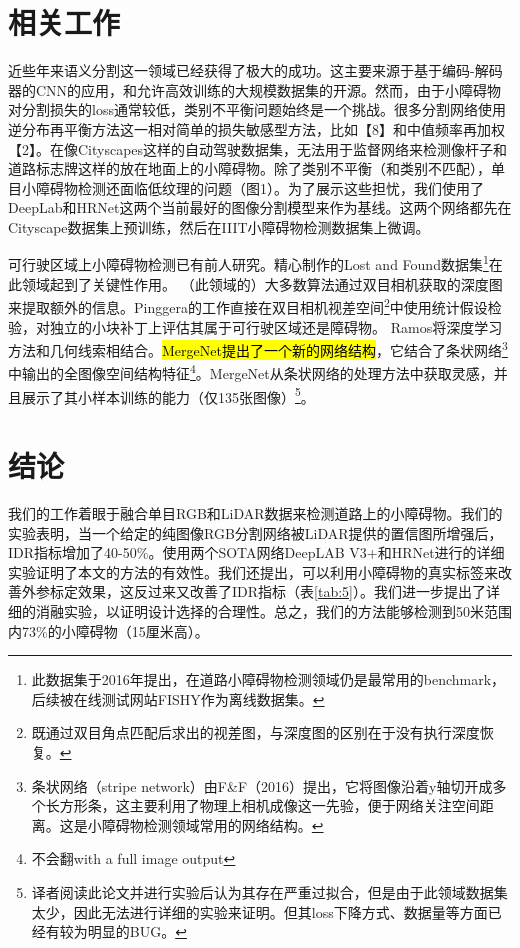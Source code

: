\documentclass[lang=cn,11pt]{elegantpaper}
\begin{document}
\section{相关工作}
近些年来语义分割这一领域已经获得了极大的成功。这主要来源于基于编码-解码器的CNN的应用，和允许高效训练的大规模数据集的开源。然而，由于小障碍物对分割损失的loss通常较低，类别不平衡问题始终是一个挑战。很多分割网络使用逆分布再平衡方法这一相对简单的损失敏感型方法，比如【8】和中值频率再加权【2】。在像Cityscapes这样的自动驾驶数据集，无法用于监督网络来检测像杆子和道路标志牌这样的放在地面上的小障碍物。除了类别不平衡（和类别不匹配），单目小障碍物检测还面临低纹理的问题（图1）。为了展示这些担忧，我们使用了DeepLab和HRNet这两个当前最好的图像分割模型来作为基线。这两个网络都先在Cityscape数据集上预训练，然后在IIIT小障碍物检测数据集上微调。

可行驶区域上小障碍物检测已有前人研究。精心制作的Lost and Found数据集\footnote{此数据集于2016年提出，在道路小障碍物检测领域仍是最常用的benchmark，后续被在线测试网站FISHY作为离线数据集。}在此领域起到了关键性作用。
（此领域的）大多数算法通过双目相机获取的深度图来提取额外的信息。Pinggera的工作直接在双目相机视差空间\footnote{既通过双目角点匹配后求出的视差图，与深度图的区别在于没有执行深度恢复。}中使用统计假设检验，对独立的小块补丁上评估其属于可行驶区域还是障碍物。
Ramos将深度学习方法和几何线索相结合。\hl{MergeNet提出了一个新的网络结构}，它结合了条状网络\footnote{条状网络（stripe network）由F&F（2016）提出，它将图像沿着y轴切开成多个长方形条，这主要利用了物理上相机成像这一先验，便于网络关注空间距离。这是小障碍物检测领域常用的网络结构。}中输出的全图像空间结构特征\footnote{不会翻with a full image output}。MergeNet从条状网络的处理方法中获取灵感，并且展示了其小样本训练的能力（仅135张图像）\footnote{译者阅读此论文并进行实验后认为其存在严重过拟合，但是由于此领域数据集太少，因此无法进行详细的实验来证明。但其loss下降方式、数据量等方面已经有较为明显的BUG。}。


\section{结论}
我们的工作着眼于融合单目RGB和LiDAR数据来检测道路上的小障碍物。我们的实验表明，当一个给定的纯图像RGB分割网络被LiDAR提供的置信图所增强后，IDR指标增加了40-50\%。使用两个SOTA网络DeepLAB V3+和HRNet进行的详细实验证明了本文的方法的有效性。我们还提出，可以利用小障碍物的真实标签来改善外参标定效果，这反过来又改善了IDR指标（表\ref{tab:5}）。我们进一步提出了详细的消融实验，以证明设计选择的合理性。总之，我们的方法能够检测到50米范围内73\%的小障碍物（15厘米高）。
\end{document}
